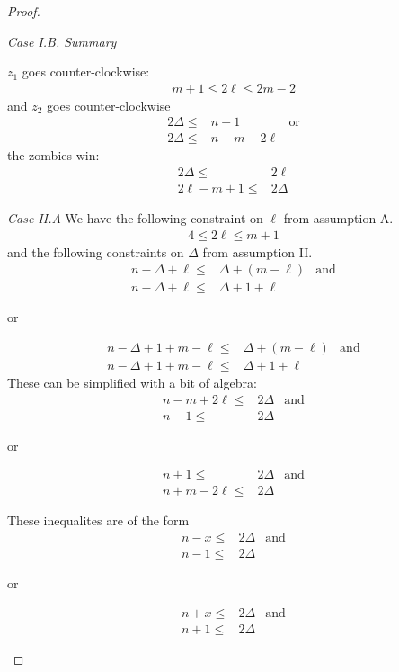 \begin{proof}
\begin{description}
  \textit{Case I.B. Summary}

  $z_1$ goes counter-clockwise:
  \begin{align*}
   m + 1 \leq 2 \ell \leq 2m - 2
  \end{align*}
  and $z_2$ goes counter-clockwise
  \begin{align*}
   2 \Delta \leq & n + 1         & \text{or} \\
   2 \Delta \leq & n + m - 2\ell
  \end{align*}
  the zombies win:
  \begin{align*}
   2 \Delta \leq      & 2 \ell   \\
   2\ell - m + 1 \leq & 2 \Delta
  \end{align*}

  \textit{Case II.A} We have the following constraint on $\ell$ from
  assumption A.
  \begin{align*}
   4 \leq 2 \ell \leq m + 1
  \end{align*}
  and the following constraints on $\Delta$ from assumption II.
  \begin{align*}
   n - \Delta + \ell \leq & \Delta + (m - \ell) & \text{and} \\
   n - \Delta + \ell \leq & \Delta + 1 + \ell
  \end{align*}
  \begin{center}or\end{center}
  \begin{align*}
   n - \Delta + 1 + m - \ell \leq & \Delta + (m - \ell) & \text{and} \\
   n - \Delta + 1 + m - \ell \leq & \Delta + 1 + \ell
  \end{align*}
  These can be simplified with a bit of algebra:
  \begin{align*}
   n-m +2\ell \leq & 2 \Delta & \text{and} \\
   n-1 \leq        & 2\Delta
  \end{align*}
  \begin{center}or\end{center}
  \begin{align*}
   n + 1 \leq         & 2 \Delta & \text{and} \\
   n + m - 2\ell \leq & 2 \Delta
  \end{align*}

  These inequalites are of the form
  \begin{align*}
   n-x \leq & 2 \Delta & \text{and} \\
   n-1 \leq & 2\Delta
  \end{align*}
  \begin{center}or\end{center}
  \begin{align*}
   n + x \leq & 2 \Delta & \text{and} \\
   n + 1 \leq & 2 \Delta
  \end{align*}


\end{description}
\end{proof}

